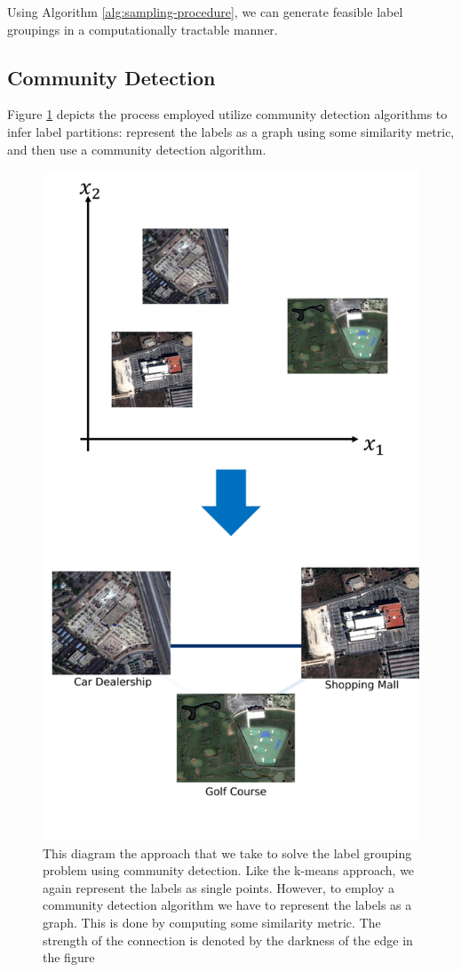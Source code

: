 \documentclass[../thesis.tex]{subfiles}
\begin{document}
Using Algorithm \ref{alg:sampling-procedure}, we can generate feasible label groupings in a computationally tractable manner.

\subsection{Community Detection}
Figure \ref{fig:ex-community-detection} depicts the process employed utilize community detection algorithms to infer label partitions: represent the labels as a graph using some similarity metric, and then use a community detection algorithm.

\begin{figure}
    \centering
    \includegraphics[width=.8\linewidth]{images/ex-community-detection.pdf}
    \caption[Community Detection Based Label Grouping]{This diagram the approach that we take to solve the label grouping problem using community detection. Like the k-means approach, we again represent the labels as single points. However, to employ a community detection algorithm we have to represent the labels as a graph. This is done by computing some similarity metric. The strength of the connection is denoted by the darkness of the edge in the figure}
    \label{fig:ex-community-detection}
\end{figure}
\end{document}
